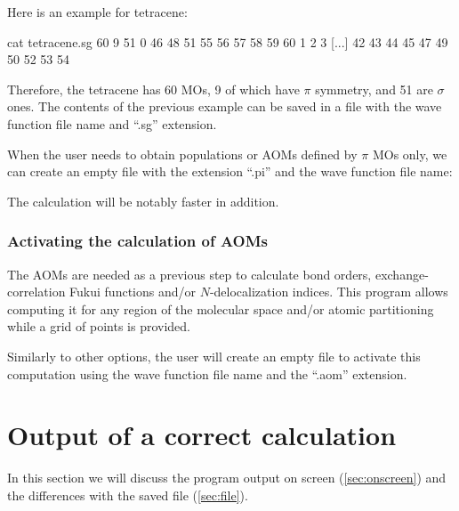\documentclass[a4paper,11pt,openany]{memoir}
\begin{document}
Here is an example for tetracene:
	\begin{consola}{cat tetracene.sg}
60 9 51 0
46 48 51 55 56 57 58 59 60
1 2 3 [...] 42 43 44 45 47 49 50 52 53 54
	\end{consola}
Therefore, the tetracene has 60 \acp{MO}, 9 of which have $\pi$ symmetry, and 51 are $\sigma$ ones. The contents of the previous example can be saved in a file with the wave function file name and ``.sg'' extension.

When the user needs to obtain populations or \acp{AOM} defined by $\pi$ \acp{MO} only, we can create an empty file with the extension ``.pi'' and the wave function file name:

The calculation will be notably faster in addition.

\subsection{Activating the calculation of \acfp{AOM}}
The \acfp{AOM} are needed as a previous step to calculate bond orders, exchange-correlation Fukui functions and/or $N$-delocalization indices. This program allows computing it for any region of the molecular space and/or atomic partitioning while a grid of points is provided.

Similarly to other options, the user will create an empty file to activate this computation using the wave function file name and the ``.aom'' extension.

\chapter{Output of a correct calculation}\label{chap:output}
In this section we will discuss the program output on screen (\autoref{sec:onscreen}) and the differences with the saved file (\autoref{sec:file}).
\end{document}
